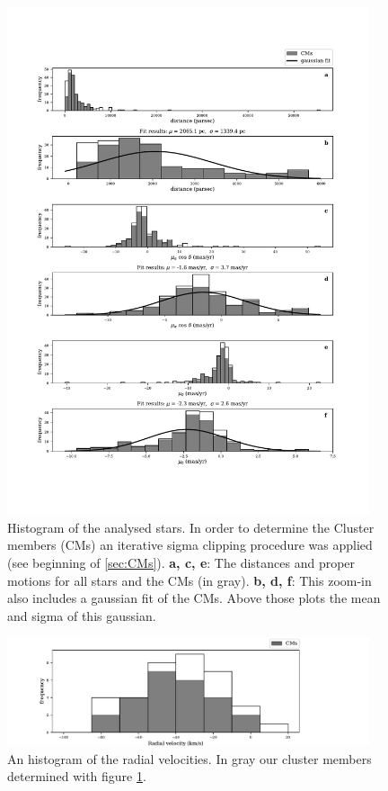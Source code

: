 \documentclass{article}
\begin{document}
\begin{figure}[H]
  \centering
    \includegraphics[trim={0 3.4cm 0 2.9cm},clip,width=0.95\textwidth]{Stock19_histogram_all.pdf}
  \caption{Histogram of the analysed stars. In order to determine the Cluster members (CMs) an iterative sigma clipping procedure was applied (see beginning of \ref{sec:CMs}). \textbf{a, c, e}: The distances and proper motions for all stars and the CMs (in gray). \textbf{b, d, f}: This zoom-in also includes a gaussian fit of the CMs. Above those plots the mean and sigma of this gaussian.}
  \label{fig:Stock19_histogram_all}
\end{figure}

\begin{figure}[H]
  \centering
    \includegraphics[trim={0 0 2cm 0},clip,width=0.95\textwidth]{Stock19_histogram_RV.pdf}
  \caption{An histogram of the radial velocities. In gray our cluster members determined with figure \ref{fig:Stock19_histogram_all}.}
  \label{fig:Stock19_histogram_RV}
\end{figure}
\end{document}
